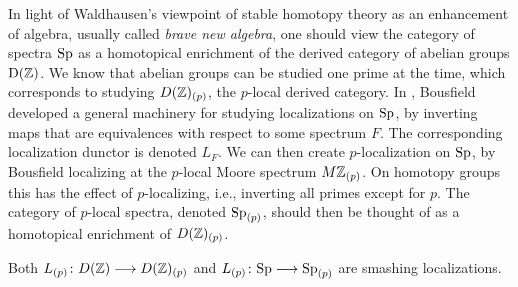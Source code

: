 In light of Waldhausen's viewpoint of stable homotopy theory as an enhancement of algebra, usually called \emph{brave new algebra}, one should view the category of spectra $\sp$ as a homotopical enrichment of the derived category of abelian groups $\Der(\Z)$. We know that abelian groups can be studied one prime at the time, which corresponds to studying $D(\Z)_{(p)}$, the $p$-local derived category. In \cite{bousfield_1979_localization}, Bousfield developed a general machinery for studying localizations on $\sp$, by inverting maps that are equivalences with respect to some spectrum $F$. The corresponding localization dunctor is denoted $L_F$. We can then create $p$-localization on $\sp$, by Bousfield localizing at the $p$-local Moore spectrum $M\Z_{(p)}$. On homotopy groups this has the effect of $p$-localizing, i.e., inverting all primes except for $p$. The category of $p$-local spectra, denoted $\sp_{(p)}$, should then be thought of as a homotopical enrichment of $D(\Z)_{(p)}$. 


\begin{remark}
    Both $L_{(p)}\colon D(\Z)\longrightarrow D(\Z)_{(p)}$ and $L_{(p)}\colon \sp\longrightarrow \sp_{(p)}$ are smashing localizations. 
\end{remark}



